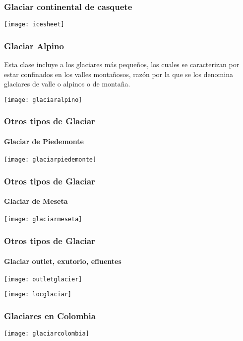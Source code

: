 \documentclass{beamer}
\begin{document}
\begin{frame}
\frametitle{Glaciar continental de casquete}
\begin{center}
\texttt{[image: icesheet]}
\end{center}
\end{frame}
\begin{frame}
\frametitle{Glaciar Alpino}
\small{Esta clase incluye a los glaciares más pequeños, los cuales se caracterizan por estar confinados en los valles montañosos, razón por la que se los denomina glaciares de valle o alpinos o de montaña.}
\begin{center}
\texttt{[image: glaciaralpino]}
\end{center}
\end{frame}
\begin{frame}
\frametitle{Otros tipos de Glaciar}
\framesubtitle{Glaciar de Piedemonte}
\begin{center}
\texttt{[image: glaciarpiedemonte]}
\end{center}
\end{frame}
\begin{frame}
\frametitle{Otros tipos de Glaciar}
\framesubtitle{Glaciar de Meseta}
\begin{center}
\texttt{[image: glaciarmeseta]}
\end{center}
\end{frame}
\begin{frame}
\frametitle{Otros tipos de Glaciar}
\framesubtitle{Glaciar outlet, exutorio, efluentes}
\begin{center}
\texttt{[image: outletglacier]}
\end{center}
\end{frame}
\begin{frame}
\begin{center}
\texttt{[image: locglaciar]}
\end{center}
\end{frame}
\begin{frame}
\frametitle{Glaciares en Colombia}
\begin{center}
\texttt{[image: glaciarcolombia]}
\end{center}
\end{frame}
\end{document}
